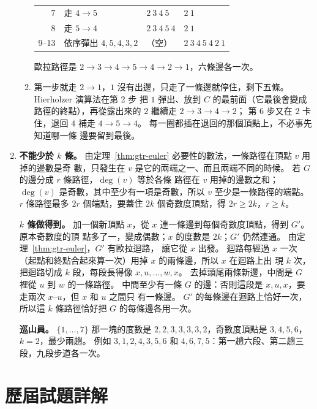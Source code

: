 \begin{enumerate}
\begin{enumerate}
\begin{center}
\begin{tabular}{rlll}
7 & 走 $4 \to 5$ & $2\ 3\ 4\ 5$ & $2\ 1$ \\
8 & 走 $5 \to 4$ & $2\ 3\ 4\ 5\ 4$ & $2\ 1$ \\
9--13 & 依序彈出 $4, 5, 4, 3, 2$ & （空） & $2\ 3\ 4\ 5\ 4\ 2\ 1$ \\
\bottomrule
\end{tabular}
\end{center}
歐拉路徑是 $2 \to 3 \to 4 \to 5 \to 4 \to 2 \to 1$，六條邊各一次。
\item 第一步就走 $2 \to 1$，$1$ 沒有出邊，只走了一條邊就停住，剩下五條。 Hierholzer 演算法在第 2 步
把 $1$ 彈出、放到 $C$ 的最前面（它最後會變成路徑的終點），再從露出來的 $2$ 繼續走 $2 \to 3 \to 4 \to 2$；
第 6 步又在 $2$ 卡住，退回 $4$ 補走 $4 \to 5 \to 4$。 每一圈都插在退回的那個頂點上，不必事先知道哪一條
邊要留到最後。
\end{enumerate}

\item \textbf{不能少於 $k$ 條。} 由定理~\ref{thm:gtr-euler} 必要性的數法，一條路徑在頂點 $v$ 用掉的邊數是奇
數，只發生在 $v$ 是它的兩端之一、而且兩端不同的時候。 若 $G$ 的邊分成 $r$ 條路徑，$\deg(v)$ 等於各條
路徑在 $v$ 用掉的邊數之和；$\deg(v)$ 是奇數，其中至少有一項是奇數，所以 $v$ 至少是一條路徑的端點。
$r$ 條路徑最多 $2r$ 個端點，要蓋住 $2k$ 個奇數度頂點，得 $2r \ge 2k$，$r \ge k$。

\textbf{$k$ 條做得到。} 加一個新頂點 $x$，從 $x$ 連一條邊到每個奇數度頂點，得到 $G'$。 原本奇數度的頂
點多了一，變成偶數；$x$ 的度數是 $2k$；$G'$ 仍然連通。 由定理~\ref{thm:gtr-euler}，$G'$ 有歐拉迴路，
讓它從 $x$ 出發。 迴路每經過 $x$ 一次（起點和終點合起來算一次）用掉 $x$ 的兩條邊，所以 $x$ 在迴路上出
現 $k$ 次，把迴路切成 $k$ 段，每段長得像 $x, u, \ldots, w, x$。 去掉頭尾兩條新邊，中間是 $G$ 裡從 $u$ 到
$w$ 的一條路徑。 中間至少有一條 $G$ 的邊：否則這段是 $x, u, x$，要走兩次 $x$--$u$，但 $x$ 和 $u$ 之間只
有一條邊。 $G'$ 的每條邊在迴路上恰好一次，所以這 $k$ 條路徑恰好把 $G$ 的每條邊各用一次。

\textbf{巡山員。} $\{1, \ldots, 7\}$ 那一塊的度數是 $2, 2, 3, 3, 3, 3, 2$，奇數度頂點是 $3, 4, 5, 6$，
$k = 2$，最少兩趟。 例如 $3, 1, 2, 4, 3, 5, 6$ 和 $4, 6, 7, 5$：第一趟六段、第二趟三段，九段步道各一次。
\end{enumerate}

\section*{歷屆試題詳解}


